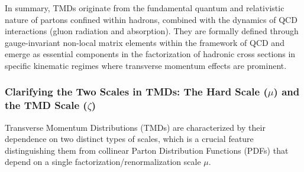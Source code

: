\documentclass[11pt]{article}
\begin{document}
In summary, TMDs originate from the fundamental quantum and relativistic nature of partons confined within hadrons, combined with the dynamics of QCD
interactions (gluon radiation and absorption). They are formally defined through gauge-invariant non-local matrix elements within the framework of
QCD and emerge as essential components in the factorization of hadronic cross sections in specific kinematic regimes where transverse momentum
effects are prominent.

\subsubsection{Clarifying the Two Scales in TMDs: The Hard Scale ($\mu$) and the TMD Scale ($\zeta$)}

Transverse Momentum Distributions (TMDs) are characterized by their dependence on two distinct types of scales, which is a crucial feature
distinguishing them from collinear Parton Distribution Functions (PDFs) that depend on a single factorization/renormalization scale $\mu$.
\end{document}
